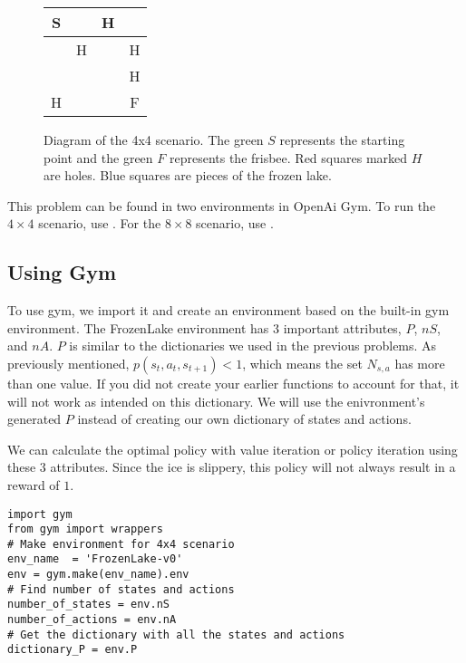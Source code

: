 \begin{figure}[H]
\begin{center}
\begin{tabular}{|c|c|c|c|}
\hline
\cellcolor{green!20}S & \cellcolor{blue!20} & \cellcolor{blue!20}\textcolor{blue!20}H & \cellcolor{blue!20} \\ \hline
\cellcolor{blue!20} & \cellcolor{red!20}H & \cellcolor{blue!20} & \cellcolor{red!20}H \\ \hline
\cellcolor{blue!20} & \cellcolor{blue!20} & \cellcolor{blue!20} & \cellcolor{red!20}H \\ \hline
\cellcolor{red!20}H & \cellcolor{blue!20} & \cellcolor{blue!20} & \cellcolor{green!20}F \\ \hline
\end{tabular}
\end{center}
\caption{Diagram of the 4x4 scenario. The green $S$ represents the starting point and the green $F$ represents the frisbee. Red squares marked $H$ are holes. Blue squares are pieces of the frozen lake.}
\label{fig:frozen_lake_4x4}
\end{figure}

This problem can be found in two environments in OpenAi Gym.
To run the $4\times 4$ scenario, use .
For the $8\times 8$ scenario, use .

\subsection*{Using Gym}
To use gym, we import it and create an environment based on the built-in gym environment.
The FrozenLake environment has $3$ important attributes, $P$, $nS$, and $nA$.
$P$ is similar to the dictionaries we used in the previous problems.
As previously mentioned, $p(s_t,a_t,s_{t+1}) < 1$, which means the set $N_{s,a}$ has more than one value.
If you did not create your earlier functions to account for that, it will not work as intended on this dictionary.
We will use the enivronment's generated $P$ instead of creating our own dictionary of states and actions.

We can calculate the optimal policy with value iteration or policy iteration using these $3$ attributes.
Since the ice is slippery, this policy will not always result in a reward of $1$.

\begin{lstlisting}
import gym
from gym import wrappers
# Make environment for 4x4 scenario
env_name  = 'FrozenLake-v0'
env = gym.make(env_name).env
# Find number of states and actions
number_of_states = env.nS
number_of_actions = env.nA
# Get the dictionary with all the states and actions
dictionary_P = env.P
\end{lstlisting}

